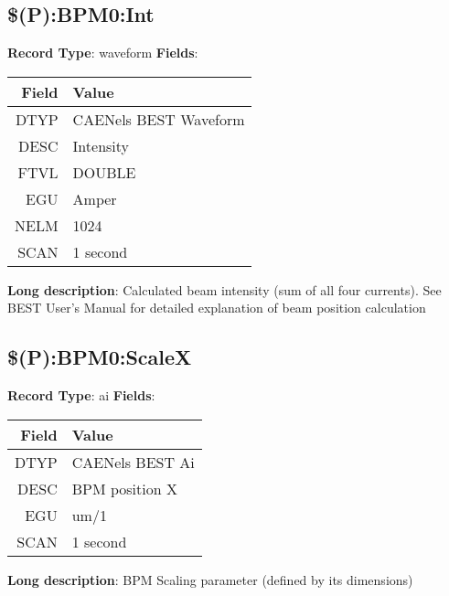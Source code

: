 \subsection{\$(P):BPM0:Int}
\textbf{Record Type}: waveform \newline \newline 
\textbf{Fields}: \newline 
\begin{tabularx}{0.7\linewidth}{|r|X|}
\hline Field & Value \\
\hline
\hline
DTYP & CAENels BEST Waveform\\
\hline
DESC & Intensity\\
\hline
FTVL & DOUBLE\\
\hline
EGU & Amper\\
\hline
NELM & 1024\\
\hline
SCAN & 1 second\\
\hline
\end{tabularx}
\newline \newline \newline
\textbf{Long description}: \newline 
 Calculated beam intensity (sum of all four currents). See BEST User's Manual for detailed explanation of beam position calculation
\newline \newline


\subsection{\$(P):BPM0:ScaleX}
\textbf{Record Type}: ai \newline \newline 
\textbf{Fields}: \newline 
\begin{tabularx}{0.7\linewidth}{|r|X|}
\hline Field & Value \\
\hline
\hline
DTYP & CAENels BEST Ai\\
\hline
DESC & BPM position X\\
\hline
EGU & um/1\\
\hline
SCAN & 1 second\\
\hline
\end{tabularx}
\newline \newline \newline
\textbf{Long description}: \newline 
 BPM Scaling parameter (defined by its dimensions)
\newline \newline


